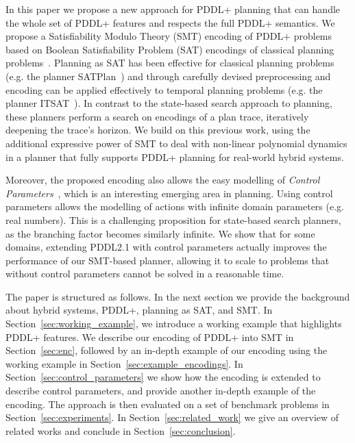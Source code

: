 In this paper we propose a new approach for PDDL+ planning that can handle the whole set of PDDL+ features and respects the full PDDL+ semantics. We propose a Satisfiability Modulo Theory (SMT) encoding of PDDL+ problems based on Boolean Satisfiability Problem (SAT) encodings of classical planning problems~\cite{kau96,rin10}. Planning as SAT has been effective for classical planning problems (e.g. the planner SATPlan~\cite{kau06}) and through carefully devised preprocessing and encoding can be applied effectively to temporal planning problems (e.g. the planner ITSAT~\cite{ran15}). In contrast to the state-based search approach to planning, these planners perform a search on encodings of a plan trace, iteratively deepening the trace's horizon. We build on this previous work, using the additional expressive power of SMT to deal with non-linear polynomial dynamics in a planner that fully supports PDDL+ planning for real-world hybrid systems.

Moreover, the proposed encoding also allows the easy modelling of \textit{Control Parameters}~\cite{savas2016planning}, which is an interesting emerging area in planning. Using control parameters allows the modelling of actions with infinite domain parameters (e.g. real numbers). This is a challenging proposition for state-based search planners, as the branching factor becomes similarly infinite. We show that for some domains, extending PDDL2.1 with control parameters actually improves the performance of our SMT-based planner, allowing it to scale to problems that without control parameters cannot be solved in a reasonable time.

The paper is structured as follows.
In the next section we provide the background about hybrid systems, PDDL+, planning as SAT, and SMT.
In Section~\ref{sec:working_example}, we introduce a working example that highlights PDDL+ features.
We describe our encoding of PDDL+ into SMT in Section~\ref{sec:enc}, followed by an in-depth example of our encoding using the working example in Section~\ref{sec:example_encodings}.
In Section~\ref{sec:control_parameters} we show how the encoding is extended to describe control parameters, and provide another in-depth example of the encoding.
The approach is then evaluated on a set of benchmark problems in Section~\ref{sec:experiments}.
In Section~\ref{sec:related_work} we give an overview of related works and conclude in Section~\ref{sec:conclusion}.
